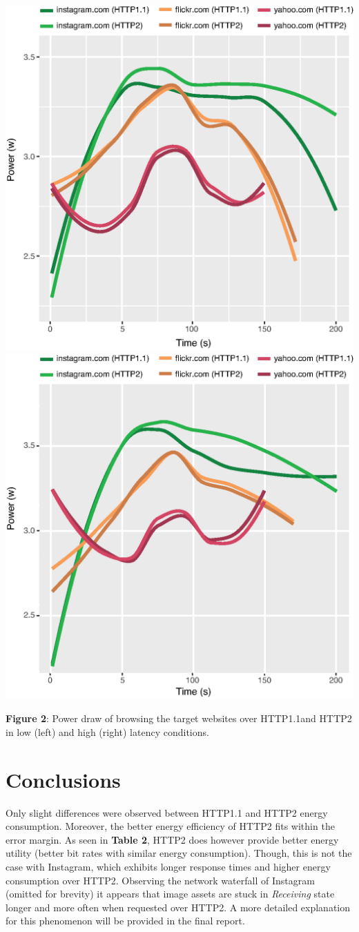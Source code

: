 \documentclass[noback]{cuposter}
\begin{document}
\centerline{
    \includegraphics[width=0.5\linewidth]{figs/average}
    \includegraphics[width=0.5\linewidth]{figs/average-vpn}
}
\vspace{-6mm}
\begin{center}
    \textbf{Figure 2}: Power draw of browsing the target websites over HTTP1.1\newline and HTTP2 in low (left) and high (right) latency conditions.
\end{center}

\vspace{-13mm}
\section{Conclusions}
Only slight differences were observed between HTTP1.1 and HTTP2 energy consumption. Moreover, the better energy efficiency of HTTP2 fits within the error margin. As seen in \textbf{Table 2}, HTTP2 does however provide better energy utility (better bit rates with similar energy consumption). Though, this is not the case with Instagram, which exhibits longer response times and higher energy consumption over HTTP2. Observing the network waterfall of Instagram (omitted for brevity) it appears that image assets are stuck in \emph{Receiving} state longer and more often when requested over HTTP2. A more detailed explanation for this phenomenon will be provided in the final report.
\end{document}
